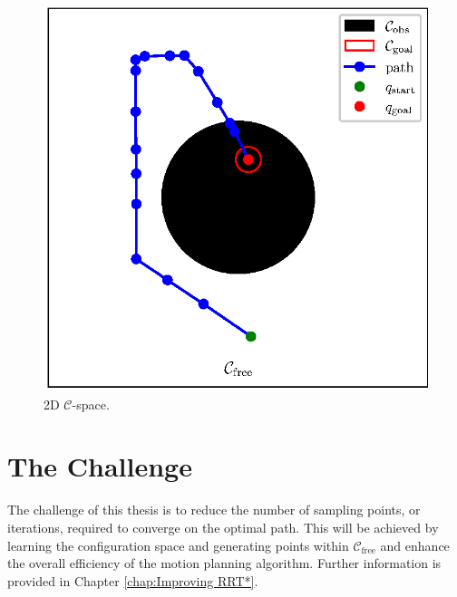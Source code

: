 \documentclass{ctuthesis}
\begin{document}
\begin{figure}
  \centering
  \includegraphics[width=0.6\linewidth]{figChap2/ConfigSpace.eps}
  \caption{2D $\mathcal{C}$-space.}
  \label{fig:config_space}
\end{figure} 
\section{The Challenge}

The challenge of this thesis is to reduce the number of 
sampling points, or iterations, 
required to converge on the optimal path. 
This will be achieved by learning 
the configuration space and generating points within $\mathcal{C}_{\text{free}}$ 
and enhance the overall efficiency of the motion planning algorithm. 
Further information is provided in Chapter \ref{chap:Improving RRT*}.
 
\end{document}
